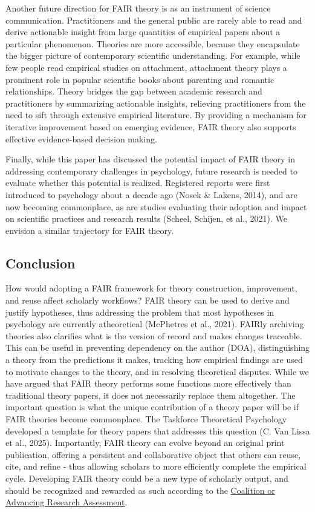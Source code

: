 \documentclass[man]{apa7}
\begin{document}
Another future direction for FAIR theory is as an instrument of science communication. Practitioners and the general public are rarely able to read and derive actionable insight from large quantities of empirical papers about a particular phenomenon.
Theories are more accessible, because they encapsulate the bigger picture of contemporary scientific understanding.
For example, while few people read empirical studies on attachment,
attachment theory plays a prominent role in popular scientific books about parenting and romantic relationships.
Theory bridges the gap between academic research and practitioners by summarizing actionable insights, relieving practitioners from the need to sift through extensive empirical literature.
By providing a mechanism for iterative improvement based on emerging evidence, FAIR theory also supports effective evidence-based decision making.

\label{evaluateimpact}{Finally, while this paper has discussed the potential impact of FAIR theory in addressing contemporary challenges in psychology,
future research is needed to evaluate whether this potential is realized.
Registered reports were first introduced to psychology about a decade ago (Nosek \& Lakens, 2014),
and are now becoming commonplace, as are studies evaluating their adoption and impact on scientific practices and research results (Scheel, Schijen, et al., 2021).
We envision a similar trajectory for FAIR theory.}

\subsection{Conclusion}\label{conclusion}

\label{turkheimer}{How would adopting a FAIR framework for theory construction, improvement, and reuse affect scholarly workflows?
FAIR theory can be used to derive and justify hypotheses,
thus addressing the problem that most hypotheses in psychology are currently atheoretical (McPhetres et al., 2021).
FAIRly archiving theories also clarifies what is the version of record and makes changes traceable.
This can be useful in preventing dependency on the author (DOA),
distinguishing a theory from the predictions it makes,
tracking how empirical findings are used to motivate changes to the theory,
and in resolving theoretical disputes.
While we have argued that FAIR theory performs some functions more effectively than traditional theory papers,
it does not necessarily replace them altogether.
The important question is what the unique contribution of a theory paper will be if FAIR theories become commonplace.
The Taskforce Theoretical Psychology developed a template for theory papers that addresses this question (C. Van Lissa et al., 2025).
Importantly, FAIR theory can evolve beyond an original print publication,
offering a persistent and collaborative object that others can reuse, cite, and refine - thus allowing scholars to more efficiently complete the empirical cycle.
Developing FAIR theory could be a new type of scholarly output, and should be recognized and rewarded as such according to the \href{https://coara.org/wp-content/uploads/2022/09/2022_07_19_rra_agreement_final.pdf}{Coalition or Advancing Research Assessment}.}
\end{document}
